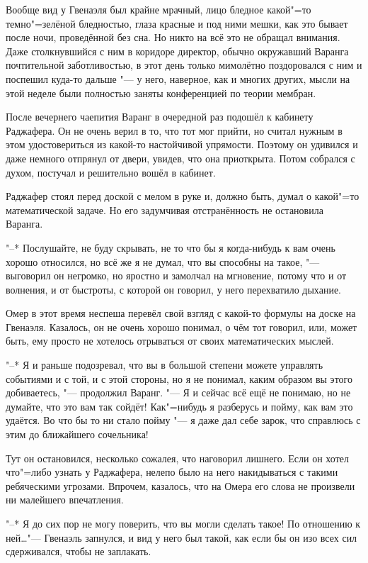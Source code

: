 Вообще вид у Гвенаэля был крайне мрачный, лицо бледное какой"=то темно"=зелёной
бледностью, глаза красные и под ними мешки, как это бывает после ночи,
проведённой без сна.
Но никто на всё это не обращал внимания.
Даже столкнувшийся с ним в коридоре директор, обычно окружавший Варанга
почтительной заботливостью, в этот день только мимолётно поздоровался с ним и
поспешил куда-то дальше "--- у него, наверное, как и многих других, мысли на
этой неделе были полностью заняты конференцией по теории мембран.

После вечернего чаепития Варанг в очередной раз подошёл к кабинету Раджафера.
Он не очень верил в то, что тот мог прийти, но считал нужным в этом
удостовериться из какой-то настойчивой упрямости.
Поэтому он удивился и даже немного отпрянул от двери, увидев, что она приоткрыта.
Потом собрался с духом, постучал и решительно вошёл в кабинет.

Раджафер стоял перед доской с мелом в руке и, должно быть, думал о какой"=то
математической задаче.
Но его задумчивая отстранённость не остановила Варанга.

"--* Послушайте, не буду скрывать, не то что бы я когда-нибудь к вам очень
хорошо относился, но всё же я не думал, что вы способны на такое, "--- выговорил
он негромко, но яростно и замолчал на мгновение, потому что и от волнения, и от
быстроты, с которой он говорил, у него перехватило дыхание.

Омер в этот время неспеша перевёл свой взгляд с какой-то формулы на доске на
Гвенаэля.
Казалось, он не очень хорошо понимал, о чём тот говорил, или, может быть, ему
просто не хотелось отрываться от своих математических мыслей.

"--* Я и раньше подозревал, что вы в большой степени можете управлять событиями
и с той, и с этой стороны, но я не понимал, каким образом вы этого добиваетесь,
"--- продолжил Варанг.
"--- Я и сейчас всё ещё не понимаю, но не думайте, что это вам так сойдёт!
Как"=нибудь я разберусь и пойму, как вам это удаётся.
Во что бы то ни стало пойму "--- я даже дал себе зарок, что справлюсь с этим до
ближайшего сочельника!

Тут он остановился, несколько сожалея, что наговорил лишнего.
Если он хотел что"=либо узнать у Раджафера, нелепо было на него накидываться с
такими ребяческими угрозами.
Впрочем, казалось, что на Омера его слова не произвели ни малейшего впечатления.

"--* Я до сих пор не могу поверить, что вы могли сделать такое!
По отношению к ней\ldots "--- Гвенаэль запнулся, и вид у него был такой, как
если бы он изо всех сил сдерживался, чтобы не заплакать.

